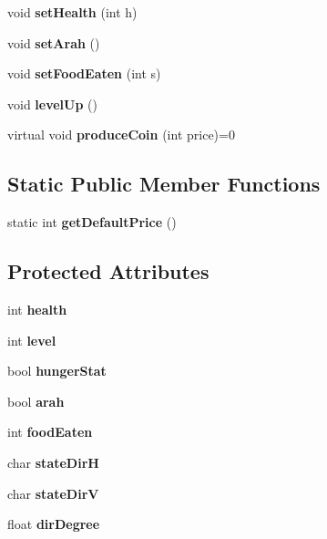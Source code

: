 \begin{DoxyCompactItemize}
void {\bfseries set\+Health} (int h)
\item 
\mbox{\label{class_ikan_a468c1517b1d7227435f19d495f8b577b}} 
void {\bfseries set\+Arah} ()
\item 
\mbox{\label{class_ikan_a38f23cfe05849034843fa1fd6b58fba6}} 
void {\bfseries set\+Food\+Eaten} (int s)
\item 
\mbox{\label{class_ikan_ad16ad4b60764965c62fb5d2d811aed76}} 
void {\bfseries level\+Up} ()
\item 
\mbox{\label{class_ikan_a1873e2aadc60b4553c3c1b00fcdc6809}} 
virtual void {\bfseries produce\+Coin} (int price)=0
\end{DoxyCompactItemize}
\subsection*{Static Public Member Functions}
\begin{DoxyCompactItemize}
\item 
\mbox{\label{class_ikan_a4116d64d65c8d7d2eb2cd9bce146d8a1}} 
static int {\bfseries get\+Default\+Price} ()
\end{DoxyCompactItemize}
\subsection*{Protected Attributes}
\begin{DoxyCompactItemize}
\item 
\mbox{\label{class_ikan_a1c10f6164f3d953e4a269f14206dd77e}} 
int {\bfseries health}
\item 
\mbox{\label{class_ikan_ab9615db3b2a13cb2ac7f443137eec7db}} 
int {\bfseries level}
\item 
\mbox{\label{class_ikan_ae0eec1e48cd85ed1c8cdefc08d58b008}} 
bool {\bfseries hunger\+Stat}
\item 
\mbox{\label{class_ikan_a0c14a4fe8f03401597701dd35e939615}} 
bool {\bfseries arah}
\item 
\mbox{\label{class_ikan_a9173ea1ea901676851ee27e7a493a975}} 
int {\bfseries food\+Eaten}
\item 
\mbox{\label{class_ikan_aef505e7bd95177f9aa47e622b607615f}} 
char {\bfseries state\+DirH}
\item 
\mbox{\label{class_ikan_af5f0010ebce279593e6eb10c9e40a302}} 
char {\bfseries state\+DirV}
\item 
\mbox{\label{class_ikan_a52e4eb9fc490ebc0e127a8ec6c702225}} 
float {\bfseries dir\+Degree}
\end{DoxyCompactItemize}
